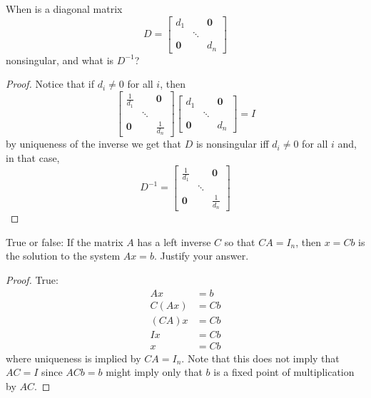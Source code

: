 \begin{problem} \label{P.1.21}
    When is a diagonal matrix
    \[
    D = \begin{bmatrix} d_1 & & \mathbf{0} \\ & \ddots & \\ \mathbf{0} & & d_n  \end{bmatrix}
    \]
    nonsingular, and what is \( D^{-1} \)?
    
    \begin{proof}
        Notice that if \( d_i \neq 0 \) for all \( i \), then
        \[
        \begin{bmatrix} \frac{1}{d_1} & & \mathbf{0} \\ & \ddots & \\ \mathbf{0} & & \frac{1}{d_n}  \end{bmatrix}\begin{bmatrix} d_1 & & \mathbf{0} \\ & \ddots & \\ \mathbf{0} & & d_n  \end{bmatrix} = I
        \]
        by uniqueness of the inverse we get that \( D \) is nonsingular iff \( d_i \neq 0 \) for all \( i \) and, in that case,
        \[
        D^{-1} = \begin{bmatrix} \frac{1}{d_1} & & \mathbf{0} \\ & \ddots & \\ \mathbf{0} & & \frac{1}{d_n} \end{bmatrix}
        \]
    \end{proof}
\end{problem}

\begin{problem} \label{P.1.22}
    
\end{problem}

\begin{problem} \label{P.1.23}
    True or false: If the matrix \( A \) has a left inverse \( C \) so that \( CA=I_n \), then \( x = Cb \) is the solution to the system \( Ax = b \). Justify your answer.
    
    \begin{proof}
        True:
        \begin{align*}
            Ax &= b \\
            C(Ax) &= Cb \\
            (CA)x &= Cb \\
            Ix &= Cb \\
            x &= Cb
        \end{align*}
        where uniqueness is implied by \( CA = I_n \). Note that this does not imply that \( AC = I \) since \( ACb = b \) might imply only that \( b \) is a fixed point of multiplication by \( AC \). 
    \end{proof}
\end{problem}

